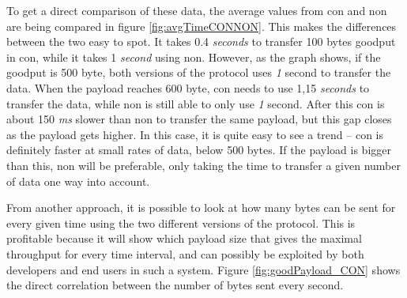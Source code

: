 
\noindent To get a direct comparison of these data, the average values from \gls{con} and \gls{non} are being compared in figure \ref{fig:avgTimeCONNON}. This makes the differences between the two easy to spot. It takes 0.4 \textit{seconds} to transfer 100 bytes \gls{goodput} in \gls{con}, while it takes 1 \textit{second} using \gls{non}. However, as the graph shows, if the goodput is 500 byte, both versions of the protocol uses \textit{1} second to transfer the data. When the \gls{payload} reaches 600 byte, \gls{con} needs to use 1,15 \textit{seconds} to transfer the data, while \gls{non} is still able to only use \textit{1} second. After this \gls{con} is about 150 \textit{ms} slower than \gls{non} to transfer the same payload, but this gap closes as the payload gets higher. In this case, it is quite easy to see a trend -- \gls{con} is definitely faster at small rates of data, below 500 bytes. If the payload is bigger than this, \gls{non} will be preferable, only taking the time to transfer a given number of data one way into account.





\noindent From another approach, it is possible to look at how many bytes can be sent for every given time using the two different versions of the protocol. This is profitable because it will show which payload size that gives the maximal \gls{throughput} for every time interval, and can possibly be exploited by both developers and end users in such a system. Figure \ref{fig:goodPayload_CON} shows the direct correlation between the number of bytes sent every second. 

